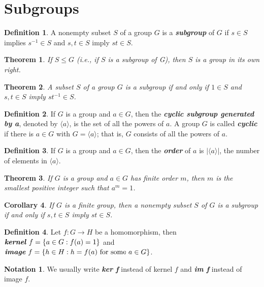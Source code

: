 \documentclass[12pt]{report}
\newtheorem{theorem}{Theorem}[chapter]
\newtheorem{corollary}[theorem]{Corollary}
\theoremstyle{definition}
\newtheorem*{definition}{Definition}
\newtheorem*{notation}{Notation}
\newcommand{\term}[1]{\textbf{\textit{#1}}}
\newcommand{\gen}[1]{{\langle}#1{\rangle}}
\begin{document}
\section{Subgroups}
\begin{definition}
	A nonempty subset $S$ of a group $G$ is a \term{subgroup} of $G$
	if $s\in S$ implies $s^{-1}\in S$ and $s, t\in S$ imply $st\in S$.
\end{definition}

\begin{theorem}
	If $S\leq G$ (i.e., if $S$ is a subgroup of G), then $S$ is a group in its own right.
\end{theorem}

\begin{theorem}
	A subset $S$ of a group $G$ is a subgroup if and only if $1\in S$ and $s, t\in S$ imply $st^{-1}\in S$.
\end{theorem}

\begin{definition}
	If $G$ is a group and $a\in G$, then the \term{cyclic subgroup generated by a}, denoted by $\gen{a}$, is the set of all the powers of $a$.
	A group $G$ is called \term{cyclic} if there is $a\in G$ with $G=\gen{a}$; that is, $G$ consists of all the powers of $a$.
\end{definition}

\begin{definition}
	If $G$ is a group and $a\in G$, then the \term{order} of $a$ is $|\gen{a}|$, the number of elements in $\gen{a}$.
\end{definition}

\begin{theorem}
	If $G$ is a group and $a\in G$ has finite order $m$, then $m$ is the smallest positive integer such that $a^m=1$.
\end{theorem}

\begin{corollary}
	If $G$ is a finite group, then a nonempty subset $S$ of $G$ is a subgroup if and only if $s, t\in S$ imply $st \in S$.
\end{corollary}

\begin{definition}
	Let $f:G\to H$ be a homomorphism, then $\term{kernel}\ f = \{ a\in G: f(a)=1\}$ and $\term{image}\ f = \{ h\in H: h=f(a) \text{ for some } a\in G \}$.
\end{definition}

\begin{notation}
	We usually write \term{ker f} instead of kernel $f$ and \term{im f} instead of image $f$.
\end{notation}
\end{document}
